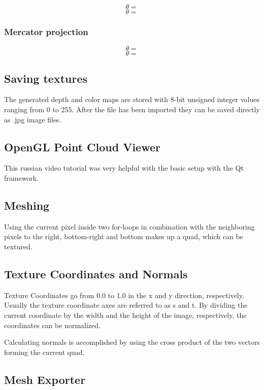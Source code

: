 $$\theta = $$
$$\theta = $$

\subsubsection{Mercator projection}

$$\theta = $$
$$\theta = $$


\subsection{Saving textures}

The generated depth and color maps are stored with 8-bit unsigned integer values ranging from 0 to 255. After the file has been imported they can be saved directly as .jpg image files.

\subsection{OpenGL Point Cloud Viewer}

This russian video tutorial was very helpful with the basic setup with the Qt framework.

\cite{ytQtOpenGL}

\subsection{Meshing}

Using the current pixel inside two for-loops in combination with the neighboring pixels to the right, bottom-right and bottom makes up a quad, which can be textured.

\subsection{Texture Coordinates and Normals}

Texture Coordinates go from 0.0 to 1.0 in the x and y direction, respectively. Usually the texture coordinate axes are referred to as s and t. By dividing the current coordinate by the width and the height of the image, respectively, the coordinates can be normalized.

Calculating normals is accomplished by using the cross product of the two vectors forming the current quad.

\subsection{Mesh Exporter}

